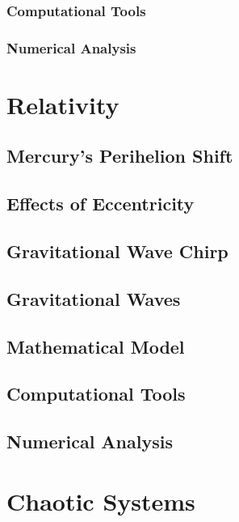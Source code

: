 \documentclass{report}
\begin{document}
        \subsection{Computational Tools}

        \subsection{Numerical Analysis}

\chapter{Relativity} \label{sec:relativity}

    \section{Mercury's Perihelion Shift}

    \section{Effects of Eccentricity}

    \section{Gravitational Wave Chirp}

    \section{Gravitational Waves}






    \section{Mathematical Model}

    \section{Computational Tools}

    \section{Numerical Analysis}

\chapter{Chaotic Systems}
\end{document}
